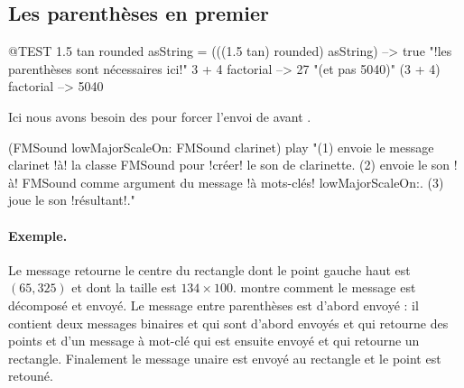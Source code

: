 \documentclass[a4paper,10pt,twoside]{book}
\begin{document}
\subsection{Les parenth\`eses en premier}


\begin{code}{@TEST}
1.5 tan rounded asString = (((1.5 tan) rounded) asString) --> true    "!les parenth\`eses sont n\'ecessaires ici!"
3 + 4 factorial   --> 27    "(et pas 5040)"
(3 + 4) factorial --> 5040
\end{code}

Ici nous avons besoin des  pour forcer l'envoi de  avant .
\begin{code}{}
(FMSound lowMajorScaleOn: FMSound clarinet) play 
"(1) envoie le message clarinet !\`a! la classe FMSound pour !cr\'eer! le son de clarinette.
 (2) envoie le son !\`a! FMSound comme argument du message !\`a mots-cl\'es! lowMajorScaleOn:.
 (3) joue le son !r\'esultant!."
\end{code}



\paragraph{Exemple.}
Le message  retourne le centre du rectangle dont le point gauche haut est $(65, 325)$ et dont la taille est $134{\times}100$.  montre comment le message est d\'ecompos\'e et envoy\'e. Le message entre parenth\`eses est d'abord envoy\'e : il contient deux messages binaires  et  qui sont d'abord envoy\'es et qui retourne des points et d'un message \`a mot-cl\'e  qui est ensuite envoy\'e et qui retourne un rectangle. Finalement le message unaire  est envoy\'e au rectangle et le point est retoun\'e.
\end{document}
